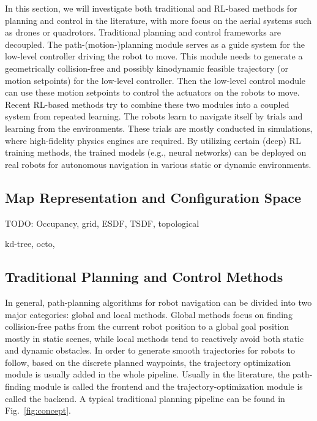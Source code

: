 \documentclass[letterpaper,journal,twoside]{IEEEtran}
\begin{document}
In this section, we will investigate both traditional 
and RL-based methods for planning and control in the 
literature, with more focus on the aerial systems 
such as drones or quadrotors.
Traditional planning and control frameworks are decoupled.
The path-(motion-)planning module serves as a guide system 
for the low-level controller driving the robot to move. 
This module needs to generate a geometrically 
collision-free and possibly kinodynamic feasible trajectory 
(or motion setpoints) for the low-level controller.
Then the low-level control module can use these motion 
setpoints to control the actuators on the robots to move.
Recent RL-based methods try to combine these two modules 
into a coupled system from repeated learning. 
The robots learn to navigate itself by trials and learning 
from the environments.
These trials are mostly conducted in simulations, 
where high-fidelity physics engines are required. 
By utilizing certain (deep) RL training methods, 
the trained models (e.g., neural networks) can be deployed 
on real robots for autonomous navigation in various static 
or dynamic environments.

\subsection{Map Representation and Configuration Space}
TODO: Occupancy, grid, ESDF, TSDF, topological

kd-tree, octo, 





\subsection{Traditional Planning and Control Methods}



In general, path-planning algorithms for robot navigation 
can be divided into two major categories: 
global and local methods.  
Global methods focus on finding collision-free paths from 
the current robot position to a global goal position mostly 
in static scenes, while local methods tend to reactively 
avoid both static and dynamic obstacles. 
In order to generate smooth trajectories for robots to 
follow, based on the discrete planned waypoints, the 
trajectory optimization module is usually added in the 
whole pipeline. 
Usually in the literature, the path-finding module 
is called the frontend and the 
trajectory-optimization module is called the backend. 
A typical traditional planning pipeline can be 
found in Fig.~\ref{fig:concept}.
\end{document}
